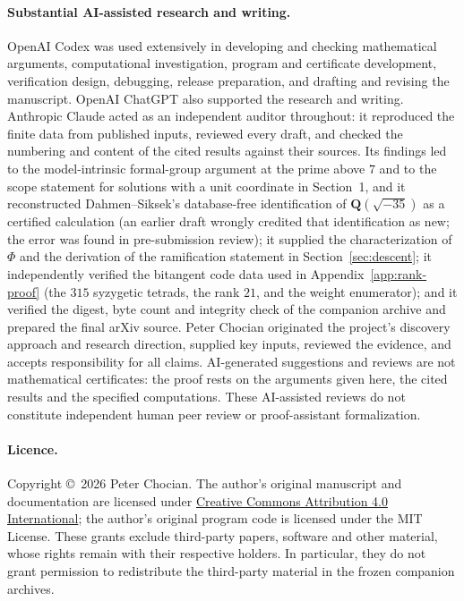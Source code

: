 \documentclass[11pt]{article}
\newcommand{\Q}{\mathbf Q}
\theoremstyle{definition}
\theoremstyle{remark}
\begin{document}
\paragraph{Substantial AI-assisted research and writing.}
OpenAI Codex was used extensively in developing and checking mathematical
arguments, computational investigation, program and certificate development,
verification design, debugging, release preparation, and drafting and
revising the manuscript.  OpenAI ChatGPT also supported the research and
writing.  Anthropic Claude acted as an independent auditor throughout:
it reproduced the finite data from published inputs, reviewed every
draft, and checked the numbering and content of the cited results
against their sources.  Its findings led to the model-intrinsic formal-group
argument at the prime above $7$ and to the scope statement for
solutions with a unit coordinate in Section~1, and it reconstructed
Dahmen--Siksek's database-free identification of $\Q(\sqrt{-35})$ as a
certified calculation (an earlier draft wrongly credited that
identification as new; the error was found in pre-submission review); it supplied the
characterization of $\Phi$ and the derivation of the ramification
statement in Section~\ref{sec:descent}; it independently verified the
bitangent code data used in Appendix~\ref{app:rank-proof} (the $315$
syzygetic tetrads, the rank $21$, and the weight enumerator); and it
verified the digest, byte count and integrity check of the companion
archive and prepared the final arXiv source.
Peter Chocian
originated the project's discovery approach and research direction,
supplied key inputs, reviewed the evidence, and accepts responsibility for
all claims.  AI-generated suggestions and reviews are not mathematical
certificates: the proof rests on the arguments given here, the cited
results and the specified computations.  These AI-assisted reviews do not
constitute independent human peer review or proof-assistant formalization.

\paragraph{Licence.}
Copyright \copyright\ 2026 Peter Chocian.  The author's original manuscript
and documentation are licensed under
\href{https://creativecommons.org/licenses/by/4.0/}{Creative Commons
Attribution 4.0 International}; the author's original program code is
licensed under the MIT License.  These grants exclude third-party papers,
software and other material, whose rights remain with their respective
holders.  In particular, they do not grant permission to redistribute
the third-party material in the frozen companion archives.
\end{document}
